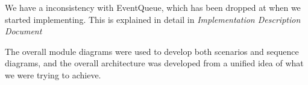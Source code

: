 We have a inconsistency with EventQueue, which has been dropped at when we started implementing.  
This is explained in detail in \emph{Implementation Description Document}

The overall module diagrams were used to develop both scenarios and
sequence diagrams, and the overall architecture was developed from a unified
idea of what we were trying to achieve.